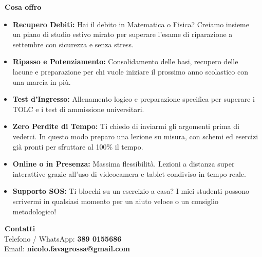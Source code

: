 \documentclass[a4paper,12pt]{article} %
\begin{document}
\begin{minipage}[t]{0.63\textwidth}
    \textcolor{mainblue}{\Large \textbf{\faChalkboardTeacher\ Cosa offro}}\\[0.2cm]
    \begin{itemize}
        \setlength{\itemsep}{0.25cm} %
        \item[\textcolor{accent}{\faCheckCircle}] \textbf{Recupero Debiti:} Hai il debito in Matematica o Fisica? Creiamo insieme un piano di studio estivo mirato per superare l'esame di riparazione a settembre con sicurezza e senza stress.
        \item[\textcolor{accent}{\faCheckCircle}] \textbf{Ripasso e Potenziamento:} Consolidamento delle basi, recupero delle lacune e preparazione per chi vuole iniziare il prossimo anno scolastico con una marcia in più.
        \item[\textcolor{accent}{\faCheckCircle}] \textbf{Test d'Ingresso:} Allenamento logico e preparazione specifica per superare i TOLC e i test di ammissione universitari.
        \item[\textcolor{accent}{\faCheckCircle}] \textbf{Zero Perdite di Tempo:} Ti chiedo di inviarmi gli argomenti prima di vederci. In questo modo preparo una lezione su misura, con schemi ed esercizi già pronti per sfruttare al 100\% il tempo.
        \item[\textcolor{accent}{\faCheckCircle}] \textbf{Online o in Presenza:} Massima flessibilità. Lezioni a distanza super interattive grazie all'uso di videocamera e tablet condiviso in tempo reale.
        \item[\textcolor{accent}{\faCheckCircle}] \textbf{Supporto SOS:} Ti blocchi su un esercizio a casa? I miei studenti possono scrivermi in qualsiasi momento per un aiuto veloce o un consiglio metodologico!
    \end{itemize}\vspace{0.4cm}
    
    \textcolor{mainblue}{\Large \textbf{\faAddressCard\ Contatti}}\\[0.2cm]
    \faPhoneSquare\ Telefono / WhatsApp: \textbf{389 0155686}\\
    \faEnvelope\ Email: \textbf{nicolo.favagrossa@gmail.com}
    
\end{minipage}%
\hfill
\end{document}
